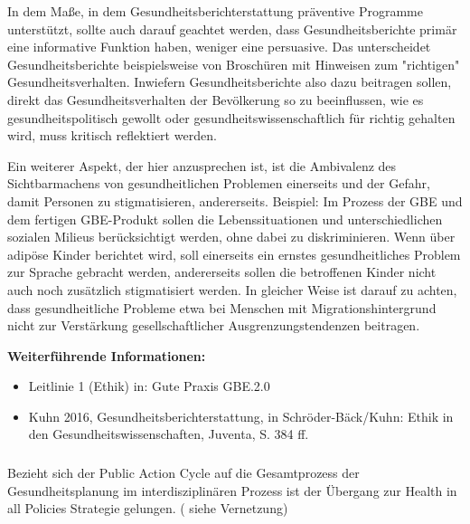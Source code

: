 \documentclass{article}
\begin{document}
In dem Maße, in dem Gesundheitsberichterstattung präventive Programme unterstützt, sollte auch darauf geachtet werden, dass Gesundheitsberichte primär eine informative Funktion haben, weniger eine persuasive. Das unterscheidet Gesundheitsberichte beispielsweise von Broschüren mit Hinweisen zum "richtigen" Gesundheitsverhalten. Inwiefern Gesundheitsberichte also dazu beitragen sollen, direkt das Gesundheitsverhalten der Bevölkerung so zu beeinflussen, wie es gesundheitspolitisch gewollt oder gesundheitswissenschaftlich für richtig gehalten wird, muss kritisch reflektiert werden.


Ein weiterer Aspekt, der hier anzusprechen ist, ist die Ambivalenz des Sichtbarmachens von gesundheitlichen Problemen einerseits und der Gefahr, damit Personen zu stigmatisieren, andererseits. Beispiel: Im Prozess der GBE und dem fertigen GBE-Produkt sollen die Lebenssituationen und unterschiedlichen sozialen Milieus berücksichtigt werden,  ohne dabei zu diskriminieren. Wenn über adipöse Kinder berichtet wird, soll einerseits ein ernstes gesundheitliches Problem zur Sprache gebracht werden, andererseits sollen die betroffenen Kinder nicht auch noch zusätzlich stigmatisiert werden. In gleicher Weise ist darauf zu achten, dass gesundheitliche Probleme etwa bei Menschen mit Migrationshintergrund nicht zur Verstärkung gesellschaftlicher Ausgrenzungstendenzen beitragen.


\textbf{Weiterführende Informationen:}

\begin{itemize}
\item Leitlinie 1 (Ethik) in: Gute Praxis GBE.2.0


\item Kuhn 2016, Gesundheitsberichterstattung, in Schröder-Bäck/Kuhn: Ethik in den Gesundheitswissenschaften, Juventa, S. 384 ff.


\end{itemize}







\subsubsection{}\label{H4753564}



Bezieht sich der Public Action Cycle auf die Gesamtprozess der Gesundheitsplanung im interdisziplinären Prozess ist der Übergang zur Health in all Policies Strategie gelungen. ( siehe Vernetzung)


\printbibliography[title={Literaturverzeichnis}]
\end{document}
